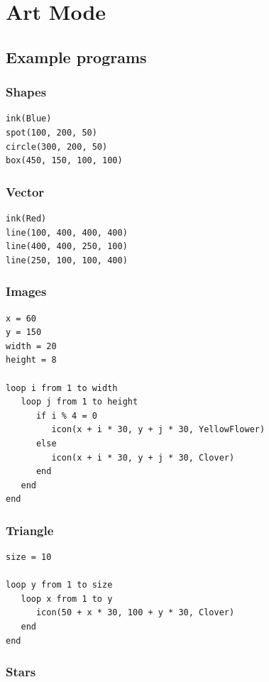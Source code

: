 \documentclass[12pt,a4paper,twoside]{article}
\renewcommand{\_}{\texttt{\symbol{95}}}
\begin{document}
\section{Art Mode}\label{sec:art-mode}

\subsection{Example programs}

\subsubsection*{Shapes}

\begin{verbatim}
ink(Blue)
spot(100, 200, 50)
circle(300, 200, 50)
box(450, 150, 100, 100)
\end{verbatim}

\subsubsection*{Vector}

\begin{verbatim}
ink(Red)
line(100, 400, 400, 400)
line(400, 400, 250, 100)
line(250, 100, 100, 400)
\end{verbatim}

\subsubsection*{Images}

\begin{verbatim}
x = 60
y = 150
width = 20
height = 8

loop i from 1 to width
   loop j from 1 to height
      if i % 4 = 0
         icon(x + i * 30, y + j * 30, YellowFlower)
      else
         icon(x + i * 30, y + j * 30, Clover)
      end
   end
end
\end{verbatim}

\subsubsection*{Triangle}

\begin{verbatim}
size = 10

loop y from 1 to size
   loop x from 1 to y
      icon(50 + x * 30, 100 + y * 30, Clover)
   end
end
\end{verbatim}

\subsubsection*{Stars}
\end{document}

